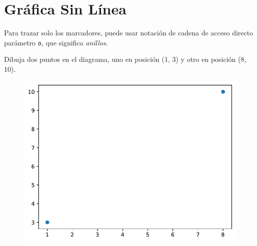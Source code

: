 \section{Gráfica Sin Línea}

Para trazar solo los marcadores, puede usar notación de cadena de acceso
directo parámetro \texttt{\textquotesingle{}o\textquotesingle{}}, que
significa \emph{\textquotesingle anillos\textquotesingle{}}.\\

\begin{code} Dibuja dos puntos en el diagrama, uno en posición (1, 3) y otro en posición (8, 10).

\begin{Shaded}
\begin{Highlighting}[]

\OperatorTok{=}\NormalTok{ np.array([}\NormalTok{, }\NormalTok{])}
\OperatorTok{=}\NormalTok{ np.array([}\NormalTok{, }\NormalTok{])}

\NormalTok{)}
\end{Highlighting}
\end{Shaded}

\begin{figure}
  \centering
  \includegraphics[scale=0.6]{img/grafica1003.pdf}
\end{figure}
\end{code}


